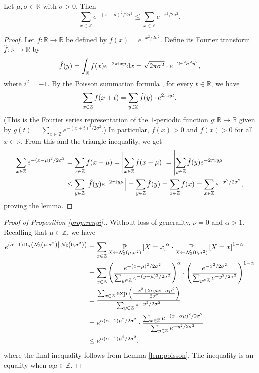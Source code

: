 \documentclass{jpc}
\newcommand{\ii}{\mathrm{i}\mkern1mu}
\newcommand{\dgausss}[2]{{\discN\left(#1,#2\right)}}
\newcommand{\pr}[2]{{\ifx&#1& \mathbb{P} \else
\underset{#1}{\mathbb{P}} \fi \left[#2\right]}}
\newcommand{\dr}[3]{\mathrm{D}_{#1}\left(#2\middle\|#3\right)}
\newcommand{\Z}{\mathbb{Z}}
\newcommand{\R}{\mathbb{R}}
\begin{document}
\begin{lem}\label{lem:poisson}
Let $\mu, \sigma \in \R$ with $\sigma>0$. Then 
\begin{equation}
\sum_{x \in \Z} e^{-(x-\mu)^2/2\sigma^2} \le \sum_{x \in \Z} e^{-x^2/2\sigma^2}.
\end{equation}
\end{lem}
\begin{proof}
Let $f\colon \R\to\R$ be defined by $f(x) = e^{-x^2/2\sigma^2}$. Define its Fourier transform $\hat{f}\colon \R \to \R$ by 
\[
    \hat{f}(y) = \int_\R f(x) e^{-2\pi\ii{}xy} \mathrm{d}x = \sqrt{2\pi\sigma^2} \cdot e^{-2\pi^2\sigma^2y^2},
\]
where $i^2=-1$.
By the Poisson summation formula \citep{poisson,poisson2}, for every $t\in\R$, we have 
\[
        \sum_{x\in\Z} f(x+t) = \sum_{y\in\Z} \hat{f}(y) \cdot e^{2\pi \ii y t}.
\]
(This is the Fourier series representation of the $1$-periodic function $g\colon \R \to \R$ given by $g(t) = \sum_{x\in\Z} e^{-(x+t)^2/2\sigma^2}$.)
In particular, $f(x)>0$ and $\hat{f}(x)>0$ for all $x \in \R$. From this and the triangle inequality, we get
\begin{align*}
    \sum_{x \in \Z} e^{-(x-\mu)^2/2\sigma^2} &=    \sum_{x\in\Z} f(x-\mu) 
    = \left| \sum_{x\in\Z} f(x-\mu) \right| 
    = \left| \sum_{y\in\Z} \hat{f}(y)e^{-2\pi \ii{} y \mu}\right| \\
    &\leq \sum_{y\in\Z} \left| \hat{f}(y)  e^{-2\pi \ii{} y \mu}\right|
    = \sum_{y\in\Z} \hat{f}(y) 
    = \sum_{x\in\Z} f(x) = \sum_{x \in \Z} e^{-x^2/2\sigma^2},
\end{align*}
proving the lemma.
\end{proof}

\begin{proof}[Proof of Proposition \ref{prop:renyi}.] Without loss of generality, $\nu=0$ and $\alpha>1$. Recalling that $\mu\in\Z$, we have
\begin{align*}
    e^{(\alpha-1)\dr{\alpha}{\dgausss{\mu}{\sigma^2}}{\dgausss{0}{\sigma^2}}} &= \sum_{x \in \Z} \pr{X \gets \dgausss{\mu}{\sigma^2}}{X=x}^\alpha \cdot \pr{X \gets \dgausss{0}{\sigma^2}}{X=x}^{1-\alpha}\\
    &= \sum_{x \in \Z} \left(\frac{e^{-(x-\mu)^2/2\sigma^2}}{\sum_{y \in \Z} e^{-(y-\mu)^2/2\sigma^2}}\right)^\alpha \cdot \left(\frac{e^{-x^2/2\sigma^2}}{\sum_{y \in \Z} e^{-y^2/2\sigma^2}}\right)^{1-\alpha}\\
    &= \frac{\sum_{x \in \Z}\exp\left(\frac{-x^2 +2\alpha\mu x -\alpha \mu^2}{2\sigma^2}\right)}{\sum_{y \in \Z} e^{-y^2/2\sigma^2}}\\
    &=  e^{\alpha(\alpha-1)\mu^2/2\sigma^2} \cdot \frac{\sum_{x \in \Z}e^{{-(x-\alpha\mu)^2}/{2\sigma^2}}}{\sum_{y \in \Z} e^{-y^2/2\sigma^2}}\\
    &\le e^{\alpha(\alpha-1)\mu^2/2\sigma^2},
\end{align*}
where the final inequality follows from Lemma \ref{lem:poisson}. The inequality is an equality when $\alpha\mu\in\Z$.
\end{proof}
\end{document}
